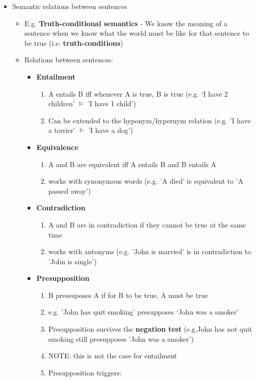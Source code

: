 \documentclass[11pt]{article}
\begin{document}
\begin{itemize}
\begin{itemize}
\begin{itemize}
\begin{itemize}
      \end{itemize}
    \end{itemize}
   \item Semantic relations between sentences
    \begin{itemize}
     \item E.g. {\bf Truth-conditional semantics} - We know the meaning of a sentence when we know what the world must be like for that sentence to be true (i.e. {\bf truth-conditions})
     \item Relations between sentences:
      \begin{itemize}
       \item {\bf Entailment}
	\begin{enumerate}
	 \item A entails B iff whenever A is true, B is true (e.g. `I have 2 children' $\models$ 'I have 1 child')
	 \item Can be extended to the hyponym/hypernym relation (e.g. 'I have a terrier' $\models$ 'I have a dog')
	\end{enumerate}
       \item {\bf Equivalence}
	\begin{enumerate}
	 \item A and B are equivalent iff A entails B and B entails A
	 \item works with synonymous words (e.g. 'A died' is equivalent to 'A passed away')
	\end{enumerate}
       \item {\bf Contradiction}
	\begin{enumerate}
	 \item A and B are in contradiction if they cannot be true at the same time
         \item works with antonyms (e.g. 'John is married' is in contradiction to 'John is single')
	\end{enumerate}
       \item {\bf Presupposition}
	\begin{enumerate}
	 \item B pressuposes A if for B to be true, A must be true
	 \item e.g. 'John has quit smoking' presupposes `John was a smoker'
	 \item Presupposition survives the {\bf negation test} (e.g.John has not quit smoking still presupposes 'John was a smoker')
	 \item NOTE: this is not the case for entailment
	 \item Presupposition triggers:

\end{enumerate}
\end{itemize}
\end{itemize}
\end{itemize}
\end{itemize}
\end{document}
